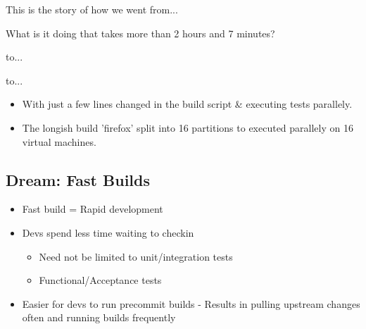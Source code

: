 \documentclass{beamer}
\begin{document}
\begin{frame}{This is the story of how we went from...}
  \begin{centering}
    \par
    \pause
    \begin{center}
      What is it doing that takes more than {\color{red}2 hours and 7 minutes}?
    \end{center}
  \end{centering}
\end{frame}

\begin{frame}{to...}
  \begin{centering}
    \par
  \end{centering}
\end{frame}

\begin{frame}{to...}
  \begin{centering}
    \par
  \end{centering}
\end{frame}

\begin{frame}
  \begin{centering}
    \begin{itemize}
    \item With just a few lines changed in the build script \& executing tests parallely.
      \pause
    \item The longish build 'firefox' split into 16 partitions to executed parallely on 16 virtual machines.
    \end{itemize}
  \end{centering}
\end{frame}

\subsection{Dream: Fast Builds}

\begin{frame}
  \begin{centering}
    \begin{itemize}
    \item Fast build = Rapid development
      \pause
    \item Devs spend less time waiting to checkin
      \begin{itemize}
      \item Need not be limited to unit/integration tests          
      \item Functional/Acceptance tests
      \end{itemize}
      \pause
    \item Easier for devs to run precommit builds - Results in pulling upstream changes often and running builds frequently
    \end{itemize}
  \end{centering}
\end{frame}
\end{document}
